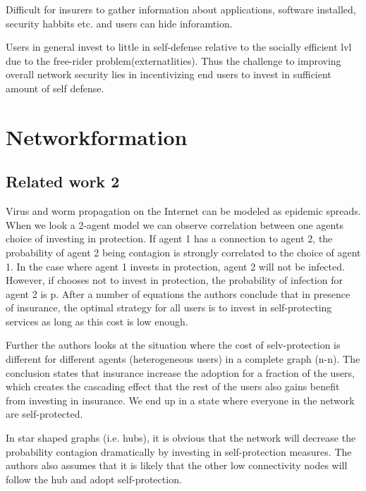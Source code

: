  Difficult for insurers to gather information about applications, software installed, security habbits
  etc. and users can hide inforamtion.
 
Users in general invest to little in self-defense relative to the socially efficient lvl due to the
 free-rider problem(externatlities).  Thus the challenge to improving overall network security lies in
  incentivizing end users to invest in sufficient amount of self defense.

\section{Networkformation}

\subsection{Related work 2}
Virus and worm propagation on the Internet can be modeled as epidemic spreads. 
When we look a 2-agent model we can observe correlation between one agents choice of investing in 
protection. If agent 1 has a connection to agent 2, the probability of agent 2 being contagion is 
strongly correlated to the choice of agent 1. In the case where agent 1 invests in protection,
 agent 2 will not be infected. However, if chooses not to invest in protection, the probability 
 of infection for agent 2 is p.
 After a number of equations the authors conclude that in presence of insurance, the optimal 
 strategy for all users is to invest in self-protecting services as long as this cost is low
  enough.

Further the authors looks at the situation where the cost of selv-protection is different for 
different agents (heterogeneous users) in a complete graph (n-n). The conclusion states that
 insurance increase the adoption for a fraction of the users, which creates the cascading effect
 that the rest of the users also gains benefit from investing in insurance. We end up in a state
  where everyone in the network are self-protected. 

In star shaped graphs (i.e. hubs), it is obvious that the network will decrease the probability
 contagion dramatically by investing in self-protection measures. The authors also assumes that it
 is likely that the other low connectivity nodes will follow the hub and adopt self-protection. 


